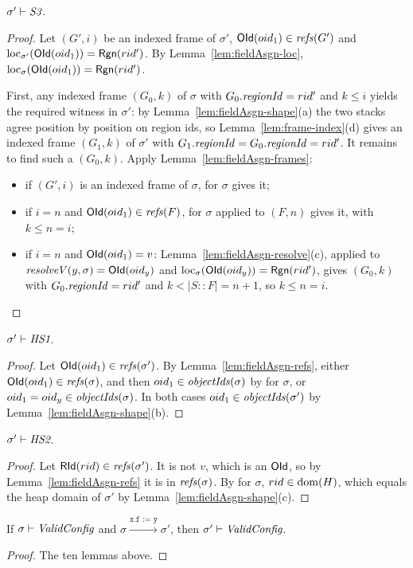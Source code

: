 \begin{lemma}[\inv{S3}] 
$\sigma' \vdash \textit{S3}$.
\end{lemma}
\begin{proof}
Let $(G', i)$ be an indexed frame of $\sigma'$, $\mathsf{OId}(oid_1) \in \mathit{refs}(G')$ and
$\mathrm{loc}_{\sigma'}(\mathsf{OId}(oid_1)) = \mathsf{Rgn}(rid')$. By Lemma~\ref{lem:fieldAsgn-loc},
$\mathrm{loc}_{\sigma}(\mathsf{OId}(oid_1)) = \mathsf{Rgn}(rid')$.

First, any indexed frame $(G_0, k)$ of $\sigma$ with $G_0.\mathit{regionId} = rid'$ and $k \le i$ yields the
required witness in $\sigma'$: by Lemma~\ref{lem:fieldAsgn-shape}(a) the two stacks agree position by
position on region ids, so Lemma~\ref{lem:frame-index}(d) gives an indexed frame $(G_1, k)$ of
$\sigma'$ with $G_1.\mathit{regionId} = G_0.\mathit{regionId} = rid'$. It remains to find such a $(G_0, k)$. Apply
Lemma~\ref{lem:fieldAsgn-frames}:
\begin{itemize}[nosep]
  \item if $(G', i)$ is an indexed frame of $\sigma$,  for $\sigma$ gives it;
  \item if $i = n$ and $\mathsf{OId}(oid_1) \in \mathit{refs}(F)$,  for $\sigma$ applied to $(F, n)$ gives it,
    with $k \le n = i$;
  \item if $i = n$ and $\mathsf{OId}(oid_1) = v$: Lemma~\ref{lem:fieldAsgn-resolve}(c), applied to
    $\mathit{resolveV}(y, \sigma) = \mathsf{OId}(oid_y)$ and $\mathrm{loc}_{\sigma}(\mathsf{OId}(oid_y)) = \mathsf{Rgn}(rid')$, gives
    $(G_0, k)$ with $G_0.\mathit{regionId} = rid'$ and $k < |S :: F| = n + 1$, so $k \le n = i$. \qedhere
\end{itemize}
\end{proof}

\begin{lemma}[\inv{HS1}] 
$\sigma' \vdash \textit{HS1}$.
\end{lemma}
\begin{proof}
Let $\mathsf{OId}(oid_1) \in \mathit{refs}(\sigma')$. By Lemma~\ref{lem:fieldAsgn-refs}, either
$\mathsf{OId}(oid_1) \in \mathit{refs}(\sigma)$, and then $oid_1 \in \mathit{objectIds}(\sigma)$ by  for $\sigma$, or
$oid_1 = oid_y \in \mathit{objectIds}(\sigma)$. In both cases $oid_1 \in \mathit{objectIds}(\sigma')$ by
Lemma~\ref{lem:fieldAsgn-shape}(b).
\end{proof}

\begin{lemma}[\inv{HS2}] 
$\sigma' \vdash \textit{HS2}$.
\end{lemma}
\begin{proof}
Let $\mathsf{RId}(rid) \in \mathit{refs}(\sigma')$. It is not $v$, which is an $\mathsf{OId}$, so by
Lemma~\ref{lem:fieldAsgn-refs} it is in $\mathit{refs}(\sigma)$. By  for $\sigma$,
$rid \in \mathrm{dom}(H)$, which equals the heap domain of $\sigma'$ by Lemma~\ref{lem:fieldAsgn-shape}(c).
\end{proof}

\begin{theorem} 
If $\sigma \vdash \textit{ValidConfig}$ and $\sigma \xrightarrow{\texttt{x.f := y}} \sigma'$, then
$\sigma' \vdash \textit{ValidConfig}$.
\end{theorem}
\begin{proof}
The ten lemmas above.
\end{proof}
